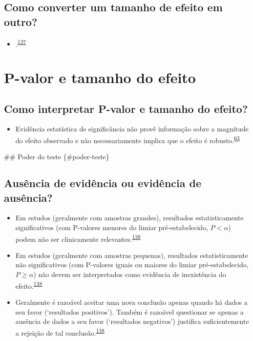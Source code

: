 \documentclass[
]{book}
\providecommand{\tightlist}{%
  \setlength{\itemsep}{0pt}\setlength{\parskip}{0pt}}
\begin{document}
\hypertarget{como-converter-um-tamanho-de-efeito-em-outro}{%
\subsection{Como converter um tamanho de efeito em outro?}\label{como-converter-um-tamanho-de-efeito-em-outro}}

\begin{itemize}
\tightlist
\item
  .\textsuperscript{\protect\hyperlink{ref-Kim2015}{137}}
\end{itemize}

\hypertarget{p-valor-e-tamanho-do-efeito}{%
\section{P-valor e tamanho do efeito}\label{p-valor-e-tamanho-do-efeito}}

\hypertarget{como-interpretar-p-valor-e-tamanho-do-efeito}{%
\subsection{Como interpretar P-valor e tamanho do efeito?}\label{como-interpretar-p-valor-e-tamanho-do-efeito}}

\begin{itemize}
\tightlist
\item
  Evidência estatística de significância não provê informação sobre a magnitude do efeito observado e não necessariamente implica que o efeito é robusto.\textsuperscript{\protect\hyperlink{ref-Landis2012}{63}}
\end{itemize}

\#\# Poder do teste \{\#poder-teste\}

\hypertarget{ausuxeancia-de-eviduxeancia-ou-eviduxeancia-de-ausuxeancia}{%
\subsection{Ausência de evidência ou evidência de ausência?}\label{ausuxeancia-de-eviduxeancia-ou-eviduxeancia-de-ausuxeancia}}

\begin{itemize}
\item
  Em estudos (geralmente com amostras grandes), resultados estatisticamente significativos (com P-valores menores do limiar pré-estabelecido, \(P<\alpha\)) podem não ser clinicamente relevantes.\textsuperscript{\protect\hyperlink{ref-altman1995}{138}}
\item
  Em estudos (geralmente com amostras pequenas), resultados estatisticamente não significativos (com P-valores iguais ou maiores do limiar pré-estabelecido, \(P≥\alpha\)) não devem ser interpretados como evidência de inexistência do efeito.\textsuperscript{\protect\hyperlink{ref-altman1995}{138}}
\item
  Geralmente é razoável aceitar uma nova conclusão apenas quando há dados a seu favor (`resultados positivos'). Também é razoável questionar se apenas a ausência de dados a seu favor (`resultados negativos') justifica suficientemente a rejeição de tal conclusão.\textsuperscript{\protect\hyperlink{ref-altman1995}{138}}
\end{itemize}
\end{document}
